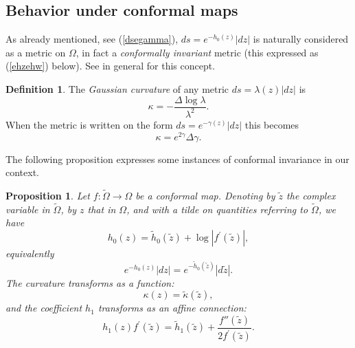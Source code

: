 \documentclass[reqno,12pt]{article}
\theoremstyle{plain}
\newtheorem{proposition}[thm]{Proposition}
\theoremstyle{definition}
\newtheorem{definition}{Definition}[section]
\numberwithin{equation}{section}
\numberwithin{figure}{section}
\begin{document}

\subsection{Behavior under conformal maps}\label{sec:conformal}

As already mentioned, see (\ref{dsegamma}), $ds=e^{-h_0(z)}|dz|$ is naturally considered as a metric on $\Omega$,
in fact a {\it conformally invariant} metric (this expressed as (\ref{ehzehw}) below). 
See in general \cite{Ahlfors-1973, Krantz-2004} for this concept.
\begin{definition}\label{def:Gaussioan curvature}
The {\it Gaussian curvature} of any metric $ds =\lambda(z)|dz|$ is
\begin{equation}\label{kappageneral}
\kappa=-\frac{\Delta \log \lambda}{\lambda^2}.
\end{equation}
When the metric is written on the form $ds=e^{-\gamma(z)}|dz|$ this becomes
\begin{equation}\label{kappa}
\kappa=e^{2 \gamma}\Delta \gamma.
\end{equation}
\end{definition}

The following proposition expresses some instances of conformal invariance in our context.
\begin{proposition}\label{lem:transformation}
Let $f:\tilde{\Omega}\to\Omega$ be a conformal map. Denoting by $\tilde{z}$ the complex variable in $\tilde{\Omega}$, by 
$z$ that in $\Omega$, and with a tilde on quantities referring to $\tilde{\Omega}$, we have
\begin{equation}\label{h0h0log}
h_0(z)=\tilde{h}_0(\tilde{z})+\log |f^\prime(\tilde{z})|, 
\end{equation}
equivalently
\begin{equation}\label{ehzehw}
e^{-h_0(z)}|dz|=e^{-\tilde{h}_0(\tilde{z})}|d\tilde{z}|.
\end{equation}
The curvature transforms as a function:
\begin{equation}\label{invcurvature}
\kappa (z)=\tilde{\kappa}(\tilde{z}),
\end{equation}
and the coefficient $h_1$ transforms as an affine connection:
\begin{equation}\label{h1}
h_1(z)f^\prime (\tilde{z})=\tilde{h}_1(\tilde{z})+\frac{f''(\tilde{z})}{2f^\prime(\tilde{z})}.
\end{equation}
\end{proposition}
\end{document}
